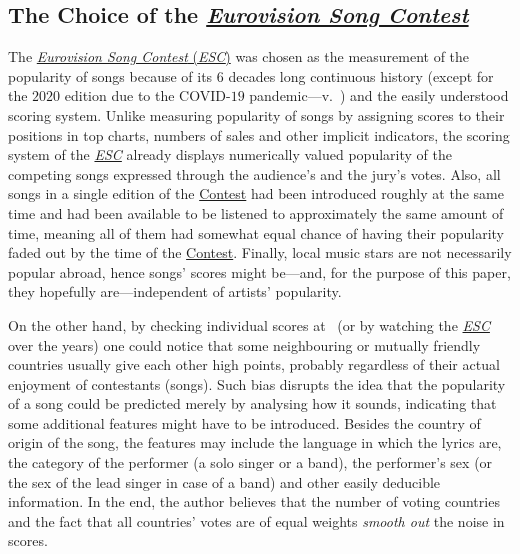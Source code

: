 \documentclass[conference, a4paper, 12pt]{IEEEtran}
\begin{document}
    \par

    \subsection{The Choice of the \href{http://eurovision.tv/}{\emph{Eurovision Song Contest}}}
    \label{subsec:the_choice_of_the_eurovision_song_contest}

    The \href{http://eurovision.tv/}{\emph{Eurovision Song Contest} (\emph{ESC})} was chosen as the measurement of the popularity of songs because of its $ 6 $ decades long continuous history (except for the $ 2020 $ edition due to the COVID-$ 19 $ pandemic---v.\ \cite{bib:EVWScores,bib:ESC2020}) and the easily understood scoring system. Unlike measuring popularity of songs by assigning scores to their positions in top charts, numbers of sales and other implicit indicators, the scoring system of the \href{http://eurovision.tv/}{\emph{ESC}} already displays numerically valued popularity of the competing songs expressed through the audience's and the jury's votes. Also, all songs in a single edition of the \href{http://eurovision.tv/}{Contest} had been introduced roughly at the same time and had been available to be listened to approximately the same amount of time, meaning all of them had somewhat equal chance of having their popularity faded out by the time of the \href{http://eurovision.tv/}{Contest}. Finally, local music stars are not necessarily popular abroad, hence songs' scores might be---and, for the purpose of this paper, they hopefully are---independent of artists' popularity.

    \par

    On the other hand, by checking individual scores at~\cite{bib:Okhuijsen2019} (or by watching the \href{http://eurovision.tv/}{\emph{ESC}} over the years) one could notice that some neighbouring or mutually friendly countries usually give each other high points, probably regardless of their actual enjoyment of contestants (songs). Such bias disrupts the idea that the popularity of a song could be predicted merely by analysing how it sounds, indicating that some additional features might have to be introduced. Besides the country of origin of the song, the features may include the language in which the lyrics are, the category of the performer (a solo singer or a band), the performer's sex (or the sex of the lead singer in case of a band) and other easily deducible information. In the end, the author believes that the number of voting countries and the fact that all countries' votes are of equal weights \emph{smooth out} the noise in scores.
\end{document}
